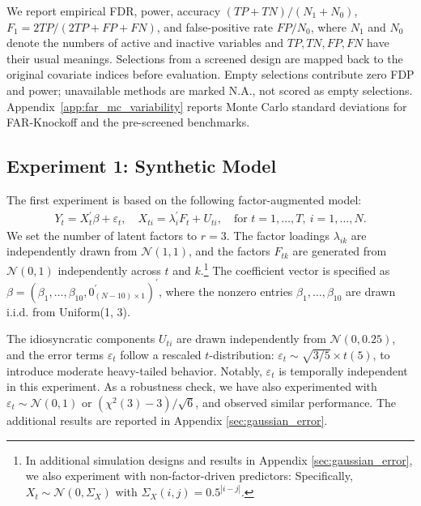 ﻿\documentclass[12pt]{article}
\newcommand{\0}{\mbox{\bf 0}}
\theoremstyle{plain}%
\theoremstyle{definition}
\begin{document}
{We report empirical FDR, power, accuracy $(TP+TN)/(N_1+N_0)$, $F_1=2TP/(2TP+FP+FN)$, and false-positive rate $FP/N_0$, where $N_1$ and $N_0$ denote the numbers of active and inactive variables and $TP,TN,FP,FN$ have their usual meanings.
Selections from a screened design are mapped back to the original covariate indices before evaluation. Empty selections contribute zero FDP and power; unavailable methods are marked N.A., not scored as empty selections. Appendix~\ref{app:far_mc_variability} reports Monte Carlo standard deviations for FAR-Knockoff and the pre-screened benchmarks.





\subsection{Experiment 1: Synthetic Model}


The first experiment is based on the following factor-augmented model:
\begin{align*}
Y_t = X_t^{\prime} \beta + \varepsilon_t, \quad
X_{ti} = \lambda_i^{\prime} F_t + U_{ti}, \quad \text{for } t = 1, \ldots, T,\ i = 1, \ldots, N.
\end{align*}
We set the number of latent factors to $r = 3$. The factor loadings $\lambda_{ik}$ are independently drawn from $\mathcal{N}(1, 1)$, and the factors $F_{tk}$ are generated from $\mathcal{N}(0, 1)$ independently across $t$ and $k$.\footnote{In additional simulation designs and results in Appendix \ref{sec:gaussian_error}, we also experiment with non-factor-driven predictors: Specifically, $X_{t} \sim \mathcal{N}(0, \Sigma_{X})$ with $\Sigma_{X}(i,j) = 0.5^{|i-j|}$.} The coefficient vector is specified as $\beta = (\beta_1, \ldots, \beta_{10}, 0^{\prime}_{(N-10) \times 1})^{\prime}$, where the nonzero entries $\beta_1, \ldots, \beta_{10}$ are drawn i.i.d. from Uniform(1, 3).

The idiosyncratic components $U_{ti}$ are drawn independently from $\mathcal{N}(0, 0.25)$, and the error terms $\varepsilon_t$ follow a rescaled $t$-distribution: $\varepsilon_t \sim \sqrt{3/5} \times t(5)$, to introduce moderate heavy-tailed behavior.  Notably, $\varepsilon_t$ is temporally independent in this experiment.  As a robustness check, we have also experimented with $\varepsilon_t \sim \mathcal{N}(0, 1)$ or $(\chi^{2}(3) - 3)/\sqrt{6}$, and observed similar performance. The additional results are reported in Appendix \ref{sec:gaussian_error}. 


}
\end{document}
